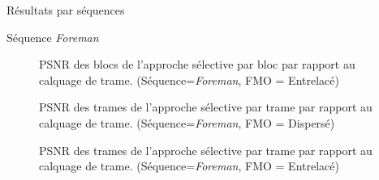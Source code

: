 \begin{section}{Résultats par séquences}
\begin{subsection}{Séquence \textit{Foreman}}
\begin{figure}  \caption[]{PSNR des blocs de l'approche sélective par bloc par rapport au
calquage de trame. (Séquence=\textit{Foreman}, FMO = Entrelacé)}
\label{fig-ParSequenceInterleaved8}
\end{figure}

\begin{figure}  \caption[]{PSNR des trames de l'approche sélective par trame par rapport au
calquage de trame. (Séquence=\textit{Foreman}, FMO = Dispersé)}
\label{fig-ParSequenceFrameDispersed8}
\end{figure}

\begin{figure}  \caption[]{PSNR des trames de l'approche sélective par trame par rapport au
calquage de trame. (Séquence=\textit{Foreman}, FMO = Entrelacé)}
\label{fig-ParSequenceFrameInterleaved8}
\end{figure}


\end{subsection}
\end{section}
